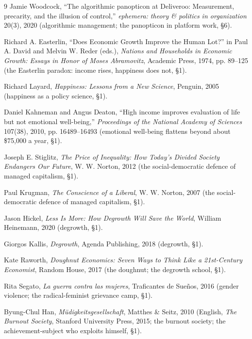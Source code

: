 \documentclass[11pt]{article}
\begin{document}
\begin{thebibliography}{9}
 Jamie Woodcock, ``The algorithmic panopticon at
Deliveroo: Measurement, precarity, and the illusion of control,''
\textit{ephemera: theory \& politics in organization} 20(3), 2020
(algorithmic management; the panopticon in platform work, \S 6).

 Richard A. Easterlin, ``Does Economic Growth
Improve the Human Lot?'' in Paul A. David and Melvin W. Reder (eds.),
\textit{Nations and Households in Economic Growth: Essays in Honor of
Moses Abramovitz}, Academic Press, 1974, pp. 89--125 (the Easterlin
paradox: income rises, happiness does not, \S 1).

 Richard Layard, \textit{Happiness: Lessons from a
New Science}, Penguin, 2005 (happiness as a policy science, \S 1).

 Daniel Kahneman and Angus Deaton, ``High
income improves evaluation of life but not emotional well-being,''
\textit{Proceedings of the National Academy of Sciences} 107(38),
2010, pp. 16489--16493 (emotional well-being flattens beyond about
\$75,000 a year, \S 1).

 Joseph E. Stiglitz, \textit{The Price of
Inequality: How Today's Divided Society Endangers Our Future}, W. W.
Norton, 2012 (the social-democratic defence of managed capitalism,
\S 1).

 Paul Krugman, \textit{The Conscience of a
Liberal}, W. W. Norton, 2007 (the social-democratic defence of managed
capitalism, \S 1).

 Jason Hickel, \textit{Less Is More: How Degrowth
Will Save the World}, William Heinemann, 2020 (degrowth, \S 1).

 Giorgos Kallis, \textit{Degrowth}, Agenda
Publishing, 2018 (degrowth, \S 1).

 Kate Raworth, \textit{Doughnut Economics: Seven
Ways to Think Like a 21st-Century Economist}, Random House, 2017 (the
doughnut; the degrowth school, \S 1).

 Rita Segato, \textit{La guerra contra las
mujeres}, Traficantes de Sueños, 2016 (gender violence; the
radical-feminist grievance camp, \S 1).

 Byung-Chul Han, \textit{Müdigkeitsgesellschaft},
Matthes \& Seitz, 2010 (English, \textit{The Burnout Society},
Stanford University Press, 2015; the burnout society; the
achievement-subject who exploits himself, \S 1).


\end{thebibliography}
\end{document}
